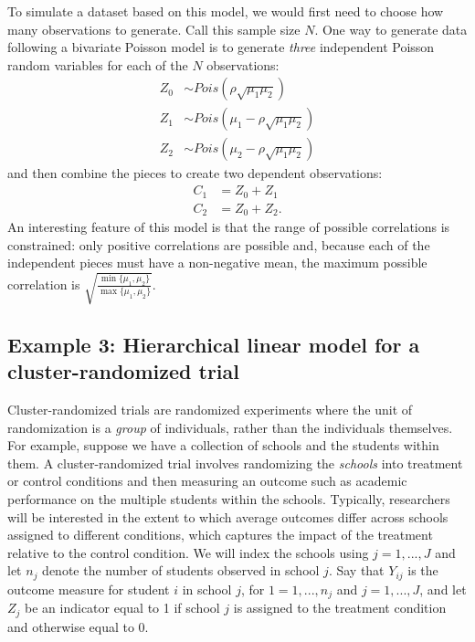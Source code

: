 \documentclass[
]{book}
\begin{document}
To simulate a dataset based on this model, we would first need to choose how many observations to generate. Call this sample size \(N\).
One way to generate data following a bivariate Poisson model is to generate \emph{three} independent Poisson random variables for each of the \(N\) observations:
\[
\begin{aligned}
Z_0 &\sim Pois\left( \rho \sqrt{\mu_1 \mu_2}\right) \\
Z_1 &\sim Pois\left(\mu_1 - \rho \sqrt{\mu_1 \mu_2}\right) \\
Z_2 &\sim Pois\left(\mu_2 - \rho \sqrt{\mu_1 \mu_2}\right)
\end{aligned}
\]
and then combine the pieces to create two dependent observations:
\[
\begin{aligned}
C_1 &= Z_0 + Z_1 \\
C_2 &= Z_0 + Z_2.
\end{aligned}
\]
An interesting feature of this model is that the range of possible correlations is constrained: only positive correlations are possible and, because each of the independent pieces must have a non-negative mean, the maximum possible correlation is \(\sqrt{\frac{\min\{\mu_1,\mu_2\}}{\max\{\mu_1,\mu_2\}}}\).

\subsection{Example 3: Hierarchical linear model for a cluster-randomized trial}\label{CRT-example}

Cluster-randomized trials are randomized experiments where the unit of randomization is a \emph{group} of individuals, rather than the individuals themselves.
For example, suppose we have a collection of schools and the students within them.
A cluster-randomized trial involves randomizing the \emph{schools} into treatment or control conditions and then measuring an outcome such as academic performance on the multiple students within the schools.
Typically, researchers will be interested in the extent to which average outcomes differ across schools assigned to different conditions, which captures the impact of the treatment relative to the control condition.
We will index the schools using \(j = 1,...,J\) and let \(n_j\) denote the number of students observed in school \(j\).
Say that \(Y_{ij}\) is the outcome measure for student \(i\) in school \(j\), for \(1 = 1,...,n_j\) and \(j = 1,...,J\), and let \(Z_j\) be an indicator equal to 1 if school \(j\) is assigned to the treatment condition and otherwise equal to 0.
\end{document}

